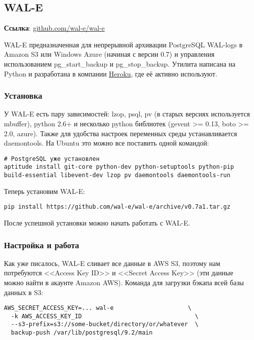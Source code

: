 \subsection{WAL-E}
\textbf{Ссылка}: \href{https://github.com/wal-e/wal-e}{github.com/wal-e/wal-e}

WAL-E предназначенная для непрерывной архивации PostgreSQL WAL-logs в Amazon S3 или Windows Azure (начиная с версии 0.7) и управления использованием pg\_start\_backup и pg\_stop\_backup. Утилита написана на Python и разработана в компании \href{http://www.heroku.com/}{Heroku}, где её активно используют.

\subsubsection{Установка}

У WAL-E есть пару зависимостей: lzop, psql, pv (в старых версиях используется mbuffer), python 2.6+ и несколько python библиотек (gevent >= 0.13, boto >= 2.0, azure). Также для удобства настроек переменных среды устанавливается daemontools. На Ubuntu это можно все поставить одной командой:

\begin{lstlisting}[label=lst:wal-e1,caption=Установка зависимостей для WAL-E]
# PostgreSQL уже установлен
aptitude install git-core python-dev python-setuptools python-pip build-essential libevent-dev lzop pv daemontools daemontools-run
\end{lstlisting}

Теперь установим WAL-E:

\begin{lstlisting}[label=lst:wal-e2,caption=Установка WAL-E]
pip install https://github.com/wal-e/wal-e/archive/v0.7a1.tar.gz
\end{lstlisting}

После успешной установки можно начать работать с WAL-E.

\subsubsection{Настройка и работа}
Как уже писалось, WAL-E сливает все данные в AWS S3, поэтому нам потребуются <<Access Key ID>> и <<Secret Access Key>> (эти данные можно найти в акаунте Amazon AWS). Команда для загрузки бэкапа всей базы данных в S3:

\begin{lstlisting}[label=lst:wal-e3,caption=Загрузка бэкапа всей базы данных в S3]
AWS_SECRET_ACCESS_KEY=... wal-e                     \
  -k AWS_ACCESS_KEY_ID                                \
  --s3-prefix=s3://some-bucket/directory/or/whatever  \
  backup-push /var/lib/postgresql/9.2/main
\end{lstlisting}

